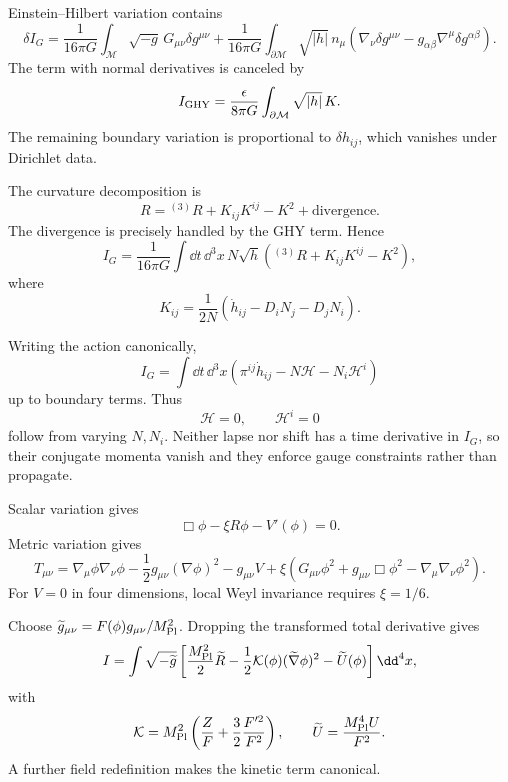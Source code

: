 \begin{solution}
Einstein--Hilbert variation contains
\[
\delta I_G=\frac1{16\pi G}\int_{\mathcal M}\sqrt{-g}\,
G_{\mu\nu}\delta g^{\mu\nu}
+\frac1{16\pi G}\int_{\partial\mathcal M}\sqrt{|h|}\,n_\mu
(\nabla_\nu\delta g^{\mu\nu}-g_{\alpha\beta}\nabla^\mu\delta g^{\alpha\beta}).
\]
The term with normal derivatives is canceled by
\[
I_{\rm GHY}=\frac{\epsilon}{8\pi G}
\int_{\partial\mathcal M}\sqrt{|h|}\,K.
\]
The remaining boundary variation is proportional to \(\delta h_{ij}\), which
vanishes under Dirichlet data.
\end{solution}

\begin{solution}
The curvature decomposition is
\[
R={}^{(3)}R+K_{ij}K^{ij}-K^2+\text{divergence}.
\]
The divergence is precisely handled by the GHY term.  Hence
\[
I_G=\frac1{16\pi G}\int\dd t\,\dd^3x\,
N\sqrt h\left({}^{(3)}R+K_{ij}K^{ij}-K^2\right),
\]
where
\[
K_{ij}=\frac1{2N}
(\dot h_{ij}-D_iN_j-D_jN_i).
\]
\end{solution}

\begin{solution}
Writing the action canonically,
\[
I_G=\int\dd t\,\dd^3x
(\pi^{ij}\dot h_{ij}-N\mathcal H-N_i\mathcal H^i)
\]
up to boundary terms.  Thus
\[
\mathcal H=0,\qquad\mathcal H^i=0
\]
follow from varying \(N,N_i\).  Neither lapse nor shift has a time derivative
in \(I_G\), so their conjugate momenta vanish and they enforce gauge
constraints rather than propagate.
\end{solution}

\begin{solution}
Scalar variation gives
\[
\Box\phi-\xi R\phi-V'(\phi)=0.
\]
Metric variation gives
\[
T_{\mu\nu}
=\nabla_\mu\phi\nabla_\nu\phi
-\frac12g_{\mu\nu}(\nabla\phi)^2-g_{\mu\nu}V
+\xi\left(G_{\mu\nu}\phi^2
+g_{\mu\nu}\Box\phi^2-\nabla_\mu\nabla_\nu\phi^2\right).
\]
For \(V=0\) in four dimensions, local Weyl invariance requires
\(\xi=1/6\).
\end{solution}

\begin{solution}
Choose
\(\widetilde g_{\mu\nu}=F(\phi)g_{\mu\nu}/M_{\rm Pl}^2\).  Dropping the
transformed total derivative gives
\[
I=\int\sqrt{-\widetilde g}\left[
\frac{M_{\rm Pl}^2}{2}\widetilde R
-\frac12\mathcal K(\phi)(\widetilde\nabla\phi)^2
-\widetilde U(\phi)\right]\dd^4x,
\]
with
\[
\mathcal K=M_{\rm Pl}^2\left(\frac{Z}{F}
+\frac32\frac{F'^2}{F^2}\right),\qquad
\widetilde U=\frac{M_{\rm Pl}^4U}{F^2}.
\]
A further field redefinition makes the kinetic term canonical.
\end{solution}


